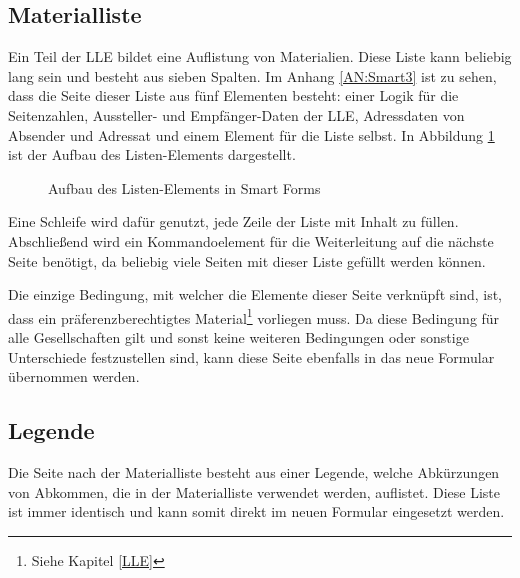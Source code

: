 	\subsection{Materialliste}
	
	Ein Teil der \ac{LLE} bildet eine Auflistung von Materialien. Diese Liste kann beliebig lang sein und besteht aus sieben Spalten. Im Anhang \ref{AN:Smart3} ist zu sehen, dass die Seite dieser Liste aus fünf Elementen besteht: einer Logik für die Seitenzahlen, Aussteller- und Empfänger-Daten der \ac{LLE}, Adressdaten von Absender und Adressat und einem Element für die Liste selbst.
	In Abbildung \ref{list_smart} ist der Aufbau des Listen-Elements dargestellt.
	
	\begin{figure}[ht]
		\centering
		\caption{Aufbau des Listen-Elements in Smart Forms}
		\label{list_smart}
	\end{figure}
	
	Eine Schleife wird dafür genutzt, jede Zeile der Liste mit Inhalt zu füllen. Abschließend wird ein Kommandoelement für die Weiterleitung auf die nächste Seite benötigt, da beliebig viele Seiten mit dieser Liste gefüllt werden können.
	
	Die einzige Bedingung, mit welcher die Elemente dieser Seite verknüpft sind, ist, dass ein präferenzberechtigtes Material\footnote{Siehe Kapitel \ref{LLE}} vorliegen muss. Da diese Bedingung für alle Gesellschaften gilt und sonst keine weiteren Bedingungen oder sonstige Unterschiede festzustellen sind, kann diese Seite ebenfalls in das neue Formular übernommen werden. 
	
	\subsection{Legende}
	\label{ist:leg}
	
	Die Seite nach der Materialliste besteht aus einer Legende, welche Abkürzungen von Abkommen, die in der Materialliste verwendet werden, auflistet. Diese Liste ist immer identisch und kann somit direkt im neuen Formular eingesetzt werden.
	
